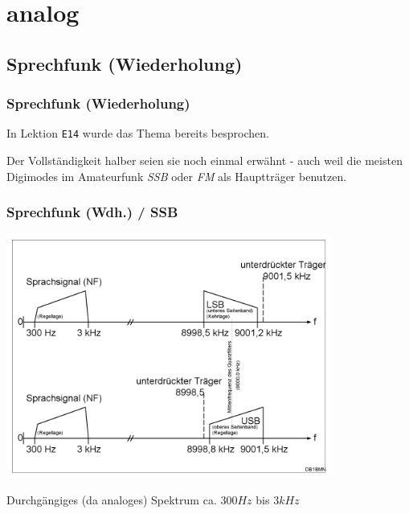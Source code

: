 \section{analog}

\subsection[Sprechfunk]{Sprechfunk (Wiederholung)}

\begin{frame}
    \frametitle{Sprechfunk (Wiederholung)}

    In Lektion \texttt{E14} wurde das Thema bereits besprochen.

    Der Vollständigkeit halber seien sie noch einmal erwähnt - auch weil die
    meisten Digimodes im Amateurfunk \emph{SSB} oder \emph{FM} als Hauptträger
    benutzen.

\end{frame}

\begin{frame}
    \frametitle{Sprechfunk (Wdh.) / SSB}

    \begin{center}
        \includegraphics[width=0.8\textwidth,height=.65\textheight,keepaspectratio]{e16/Ssb-de.png}
        \tiny \hyperlink{refs}{\cite{wc}}
    \end{center}

    Durchgängiges (da analoges) Spektrum ca. $300 Hz$ bis $3 kHz$

\end{frame}

